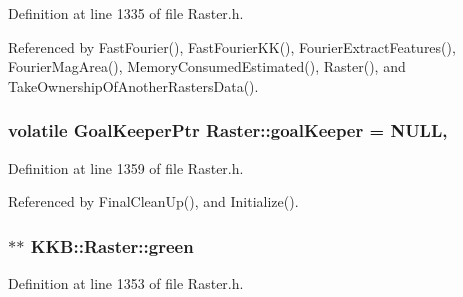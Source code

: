 Definition at line 1335 of file Raster.\+h.



Referenced by Fast\+Fourier(), Fast\+Fourier\+K\+K(), Fourier\+Extract\+Features(), Fourier\+Mag\+Area(), Memory\+Consumed\+Estimated(), Raster(), and Take\+Ownership\+Of\+Another\+Rasters\+Data().

\subsubsection[{\texorpdfstring{goal\+Keeper}{goalKeeper}}]{\setlength{\rightskip}{0pt plus 5cm}volatile {\bf Goal\+Keeper\+Ptr} Raster\+::goal\+Keeper = N\+U\+LL\hspace{0.3cm}{\ttfamily [static]}, {\ttfamily [protected]}}\hypertarget{class_k_k_b_1_1_raster_a6ac10b7d375feef9d68f8af61107687d}{}\label{class_k_k_b_1_1_raster_a6ac10b7d375feef9d68f8af61107687d}


Definition at line 1359 of file Raster.\+h.



Referenced by Final\+Clean\+Up(), and Initialize().

\subsubsection[{\texorpdfstring{green}{green}}]{$\ast$$\ast$ K\+K\+B\+::\+Raster\+::green\hspace{0.3cm}{\ttfamily [protected]}}\hypertarget{class_k_k_b_1_1_raster_a2d2238911145488e226cd2e34fc8448c}{}\label{class_k_k_b_1_1_raster_a2d2238911145488e226cd2e34fc8448c}


Definition at line 1353 of file Raster.\+h.



